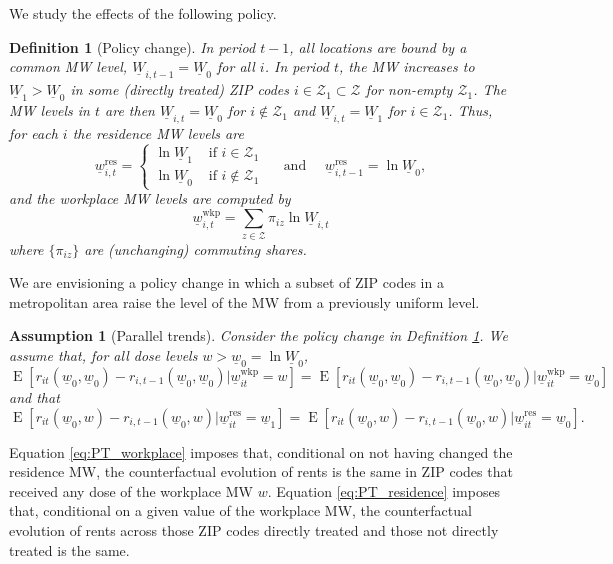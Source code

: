 \documentclass{article}
\newtheorem{assu}{Assumption}
\newtheorem{definition}{Definition}
\newcommand{\Z}{\mathcal{Z}}
\newcommand{\MW}{\underline{W}}
\newcommand{\mw}{\underline{w}}
\newcommand{\wkp}{\text{wkp}}
\newcommand{\res}{\text{res}}
\DeclareMathOperator{\E}{E}
\begin{document}
We study the effects of the following policy.
\begin{definition}[Policy change]\label{def:policy_change}
    In period $t-1$, all locations are bound by a common MW level, 
    $\MW_{i,t-1}=\MW_0$ for all $i$.
    In period $t$, the MW increases to $\MW_1>\MW_0$ in some 
    (directly treated) ZIP codes $i\in\Z_1\subset\Z$ for non-empty $\Z_1$.
    The MW levels in $t$ are then 
    $\MW_{i,t}=\MW_0$ for $i\notin\Z_1$ and
    $\MW_{i,t}=\MW_1$ for $i\in\Z_1$.
    Thus, for each $i$ the residence MW levels are
    $$
    \mw_{i,t}^{\res} = 
    \begin{cases}
        \ln \MW_1 & \text{ if } i\in\Z_1 \\
        \ln \MW_0 & \text{ if } i\notin\Z_1 
    \end{cases}
    \quad\text{ and }\quad
    \mw_{i,t-1}^{\res} = \ln \MW_0 ,
    $$
    and the workplace MW levels are computed by
    $$
    \mw_{i,t}^{\wkp} = \sum_{z\in\Z} \pi_{iz} \ln \MW_{i,t}
    $$
    where $\{\pi_{iz}\}$ are (unchanging) commuting shares.
\end{definition}

We are envisioning a policy change in which a subset of ZIP codes in a metropolitan 
area raise the level of the MW from a previously uniform level.

\begin{assu}[Parallel trends] \label{assu:PT}
    Consider the policy change in Definition \ref{def:policy_change}.
    We assume that, for all dose levels $w>\mw_0 = \ln \MW_0$,
    \begin{equation}\label{eq:PT_workplace}
        \E\left[r_{it}(\mw_0, \mw_0) - r_{i,t-1}(\mw_0, \mw_0) \big| \mw_{it}^{\wkp} = w \right] 
        = \E\left[r_{it}(\mw_0, \mw_0) - r_{i,t-1}(\mw_0, \mw_0) \big| \mw_{it}^{\wkp} = \mw_0 \right] 
    \end{equation}
    and that
    \begin{equation}\label{eq:PT_residence}
        \E\left[r_{it}(\mw_0, w) - r_{i,t-1}(\mw_0, w) \big| \mw_{it}^{\res} = \mw_1 \right] 
        = \E\left[r_{it}(\mw_0, w) - r_{i,t-1}(\mw_0, w) \big| \mw_{it}^{\res} = \mw_0 \right] .
    \end{equation}
\end{assu}

Equation \eqref{eq:PT_workplace} imposes that, conditional on not having changed
the residence MW, the counterfactual evolution of rents is the same in ZIP codes
that received any dose of the workplace MW $w$.
Equation \eqref{eq:PT_residence} imposes that, conditional on a given value of
the workplace MW, the counterfactual evolution of rents across those ZIP codes
directly treated and those not directly treated is the same.
\end{document}
